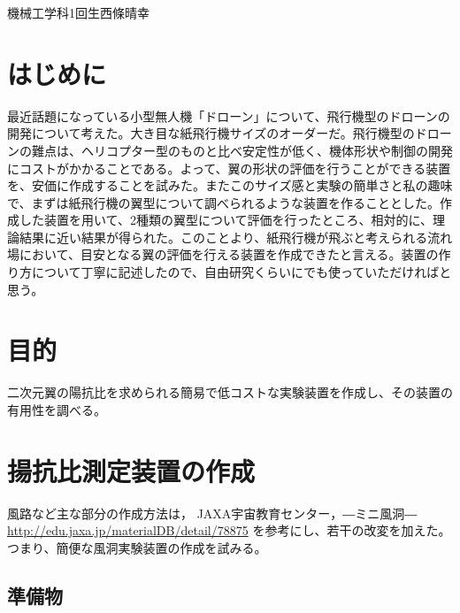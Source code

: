 \documentclass[11pt,b5paper,papersize,dvipdfmx]{jsbook}
\begin{document}
%
                {機械工学科1回生}{西條晴幸}

%
\section*{はじめに}
最近話題になっている小型無人機「ドローン」について、飛行機型のドローンの開発について考えた。大き目な紙飛行機サイズのオーダーだ。飛行機型のドローンの難点は、ヘリコプター型のものと比べ安定性が低く、機体形状や制御の開発にコストがかかることである。よって、翼の形状の評価を行うことができる装置を、安価に作成することを試みた。またこのサイズ感と実験の簡単さと私の趣味で、まずは紙飛行機の翼型について調べられるような装置を作ることとした。作成した装置を用いて、2種類の翼型について評価を行ったところ、相対的に、理論結果に近い結果が得られた。このことより、紙飛行機が飛ぶと考えられる流れ場において、目安となる翼の評価を行える装置を作成できたと言える。装置の作り方について丁寧に記述したので、自由研究くらいにでも使っていただければと思う。

\section{目的}
二次元翼の陽抗比を求められる簡易で低コストな実験装置を作成し、その装置の有用性を調べる。
\section{揚抗比測定装置の作成}
風路など主な部分の作成方法は，
JAXA宇宙教育センター，―ミニ風洞― \url{http://edu.jaxa.jp/materialDB/detail/78875}
を参考にし、若干の改変を加えた。つまり、簡便な風洞実験装置の作成を試みる。
\subsection{準備物}
\end{document}
